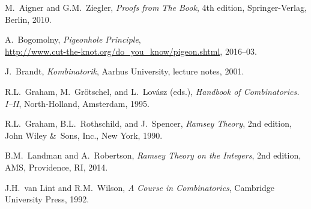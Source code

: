 \documentclass[a4paper]{article}
\begin{document}
\begin{thebibliography}{9}

M.~Aigner and G.M.~Ziegler,
{\sl Proofs from The Book}, 4th edition, Springer-Verlag, Berlin, 2010.

A.~Bogomolny, {\sl Pigeonhole Principle},\\ \url{http://www.cut-the-knot.org/do_you_know/pigeon.shtml}, 2016--03.

J.~Brandt, {\sl Kombinatorik}, Aarhus University, lecture notes, 2001.

R.L.~Graham, M.~Gr\"otschel, and L.~Lov\'asz (eds.),
{\sl Handbook of Combinatorics. I--II}, North-Holland, Amsterdam, 1995.

R.L.~Graham, B.L.~Rothschild, and J.~Spencer,
{\sl Ramsey Theory}, 2nd edition, John Wiley \&\ Sons, Inc., New York, 1990.

B.M.~Landman and A.~Robertson,
{\sl Ramsey Theory on the Integers}, 2nd edition, AMS, Providence, RI, 2014.

J.H.~van Lint and R.M.~Wilson,
{\sl A Course in Combinatorics}, Cambridge University Press, 1992.

\end{thebibliography}
\end{document}
